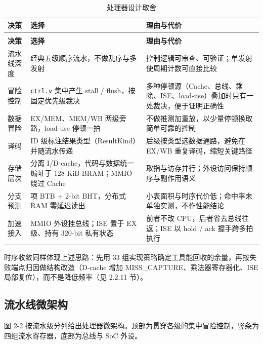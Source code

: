 {\small
\setlength{\tabcolsep}{4pt}
\renewcommand{\thetable}{2-2}
\begin{longtable}{@{}>{\raggedright\arraybackslash}p{}>{\raggedright\arraybackslash}p{}>{\raggedright\arraybackslash}p{}@{}}
\caption{处理器设计取舍}\label{tab:2-2}\\
\toprule
\textbf{决策} & \textbf{选择} & \textbf{理由与代价} \\
\midrule
\endfirsthead
\multicolumn{3}{@{}l}{\footnotesize 续表 2-2}\\
\toprule
\textbf{决策} & \textbf{选择} & \textbf{理由与代价} \\
\midrule
\endhead
流水线深度 & 经典五级顺序流水，不做乱序与多发射 & 控制逻辑可审查、可验证；单发射使周期计数可直接比较 \\
冒险控制 & \texttt{ctrl.\allowbreak{}v} 集中产生 stall / flush，按固定优先级裁决 & 多种停顿源（Cache、总线、乘除、ISE、load-use）叠加时只有一处裁决，便于证明正确性 \\
数据冒险 & EX/MEM、MEM/WB 两级旁路，load-use 停顿一拍 & 不做推测加重放，以少量停顿换取简单可靠的控制 \\
译码 & ID 级标注结果类型（ResultKind）并随流水传递 & 后级按类型选数据通路，避免在 EX/WB 重复译码，缩短关键路径 \\
存储层次 & 分离 I/D-cache，代码与数据统一编址于 128 KiB BRAM；MMIO 绕过 Cache & 取指与访存并行；外设访问保持顺序与副作用语义 \\
分支预测 & 64 项 BTB + 2-bit BHT，分布式 RAM 零延迟读出 & 小表面积与时序代价低；命中率未单独实测，不作性能结论 \\
加速接入 & MMIO 外设挂总线；ISE 置于 EX 级、持有 320-bit 私有状态 & 前者不改 CPU，后者省去总线往返；ISE 以 hold / ack 握手跨多拍执行 \\
\bottomrule
\end{longtable}
}

时序收敛同样体现上述思路：先用 33 组实现策略确定工具能回收的余量，再按失败端点归因做结构改造（D-cache 增加 MISS\_CAPTURE、乘法器寄存器化、ISE 局部复位），而不是降低频率（见 2.2.11 节）。

\Needspace{85pt}

\subsection{流水线微架构}

图 2-2 按流水级分列给出处理器微架构。顶部为贯穿各级的集中冒险控制，竖条为四组流水寄存器，底部为总线与 SoC 外设。

